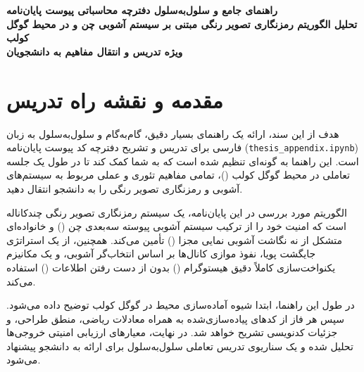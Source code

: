 




\begin{center}
    \vspace*{1cm}
    \Huge{\bfseries راهنمای جامع و سلول‌به‌سلول دفترچه محاسباتی پیوست پایان‌نامه} \\
    \vspace{0.5cm}
    \Large{\bfseries تحلیل الگوریتم رمزنگاری تصویر رنگی مبتنی بر سیستم آشوبی چن و  در محیط گوگل کولب} \\
    \vspace{1cm}
    \large{\bfseries ویژه تدریس و انتقال مفاهیم به دانشجویان} \\
    \vspace{1.5cm}
\end{center}

\tableofcontents
\newpage

\chapter{مقدمه و نقشه راه تدریس}
هدف از این سند، ارائه یک راهنمای بسیار دقیق، گام‌به‌گام و سلول‌به‌سلول به زبان فارسی برای تدریس و تشریح دفترچه کد پیوست پایان‌نامه (\texttt{thesis\_appendix.ipynb}) است. این راهنما به گونه‌ای تنظیم شده است که به شما کمک کند تا در طول یک جلسه تعاملی در محیط گوگل کولب ()، تمامی مفاهیم تئوری و عملی مربوط به سیستم‌های آشوبی و رمزنگاری تصویر رنگی را به دانشجو انتقال دهید. 

الگوریتم مورد بررسی در این پایان‌نامه، یک سیستم رمزنگاری تصویر رنگی چندکاناله است که امنیت خود را از ترکیب سیستم آشوبی پیوسته سه‌بعدی چن () و خانواده‌ای متشکل از نه نگاشت آشوبی نمایی مجزا () تأمین می‌کند. همچنین، از یک استراتژی جایگشت پویا، نفوذ موازی کانال‌ها بر اساس انتخاب‌گر آشوبی، و یک مکانیزم یکنواخت‌سازی کاملاً دقیق هیستوگرام () بدون از دست رفتن اطلاعات () استفاده می‌کند.

در طول این راهنما، ابتدا شیوه آماده‌سازی محیط در گوگل کولب توضیح داده می‌شود. سپس هر فاز از کدهای پیاده‌سازی‌شده به همراه معادلات ریاضی، منطق طراحی، و جزئیات کدنویسی تشریح خواهد شد. در نهایت، معیارهای ارزیابی امنیتی خروجی‌ها تحلیل شده و یک سناریوی تدریس تعاملی سلول‌به‌سلول برای ارائه به دانشجو پیشنهاد می‌شود.

